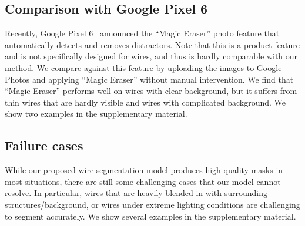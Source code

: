 \subsection{Comparison with Google Pixel 6}
\vspace{-1.5mm}
% 
Recently, Google Pixel 6~\cite{Pixel6as49} announced the ``Magic Eraser'' photo feature that automatically detects and removes distractors. Note that this is a product feature and is not specifically designed for wires, and thus is hardly comparable with our method. We compare against this feature by uploading the images to Google Photos and applying ``Magic Eraser'' without manual intervention. We find that ``Magic Eraser'' performs well on wires with clear background, but it suffers from thin wires that are hardly visible and wires with complicated background. We show two examples in the supplementary material.

\subsection{Failure cases}
\vspace*{-2.5mm}
% 

While our proposed wire segmentation model produces high-quality masks in most situations, there are still some challenging cases that our model cannot resolve. In particular, wires that are heavily blended in with surrounding structures/background, or wires under extreme lighting conditions are challenging to segment accurately. We show several examples in the supplementary material.







